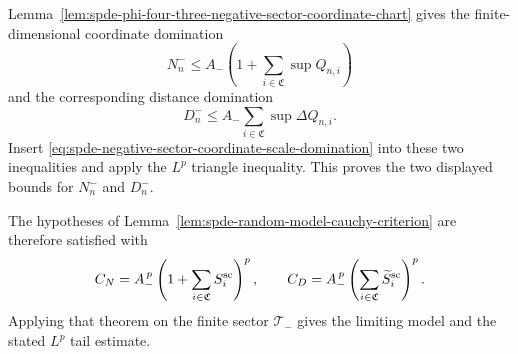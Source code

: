 Lemma~\ref{lem:spde-phi-four-three-negative-sector-coordinate-chart}
gives the finite-dimensional coordinate domination
\[
  N_n^-
  \leq
  A_-\left(1+\sum_{i\in\mathfrak C}\sup Q_{n,i}\right)
\]
and the corresponding distance domination
\[
  D_n^-
  \leq
  A_-\sum_{i\in\mathfrak C}\sup\Delta Q_{n,i}.
\]
Insert \eqref{eq:spde-negative-sector-coordinate-scale-domination} into these
two inequalities and apply the \(L^p\) triangle inequality.  This proves the
two displayed bounds for \(N_n^-\) and \(D_n^-\).

The hypotheses of Lemma~\ref{lem:spde-random-model-cauchy-criterion} are
therefore satisfied with
\[
  C_N=
  A_-^{\,p}\left(1+\sum_{i\in\mathfrak C}S_i^{\rm sc}\right)^p,
  \qquad
  C_D=
  A_-^{\,p}\left(\sum_{i\in\mathfrak C}\widetilde S_i^{\rm sc}\right)^p .
\]
Applying that theorem on the finite sector \(\mathcal T_-\) gives the limiting
model and the stated \(L^p\) tail estimate.

